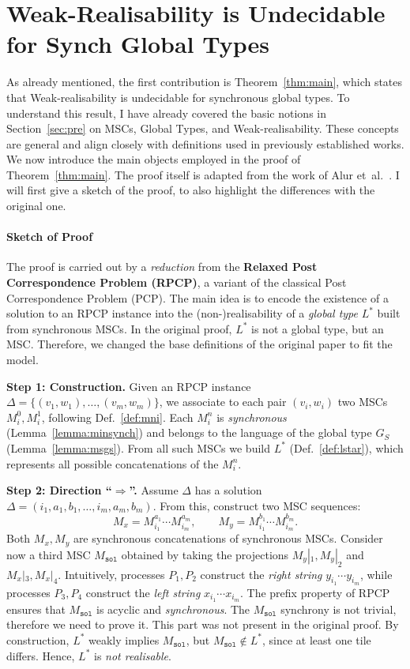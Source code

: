 \chapter{Weak-Realisability is Undecidable for Synch Global Types}\label{sec:proof}

As already mentioned, the first contribution is Theorem~\ref{thm:main},
which states that Weak-realisability is undecidable for synchronous global types. 
To understand this result, I have already covered the basic notions in 
Section~\ref{sec:pre} on MSCs, Global Types, and Weak-realisability. 
These concepts are general and align 
closely with definitions used in previously established works. 
We now introduce the main objects employed in the proof of Theorem~\ref{thm:main}. 
The proof itself is adapted from the work of 
Alur et~al.~\cite{alur2005realizability}. 
I will first give a sketch of the proof, to also highlight the 
differences with the original one.

\subsubsection*{Sketch of Proof}
The proof is carried out by a \emph{reduction} from the
\textbf{Relaxed Post Correspondence Problem (RPCP)}, a variant of
the classical Post Correspondence Problem (PCP).
The main idea is to encode the existence of a
solution to an RPCP instance into the (non-)realisability of a
\emph{global type} $L^*$ built from synchronous MSCs. 
In the original proof, $L^*$ is not a global type, but an MSC.
Therefore, we changed the base definitions of the original paper
to fit the model. 

\bigskip

\textbf{Step 1: Construction.}
Given an RPCP instance $\Delta = \{(v_1,w_1),\ldots,(v_m,w_m)\}$,
we associate to each pair $(v_i,w_i)$ two MSCs $M^0_i,M^1_i$,
following Def.~\ref{def:mni}. Each $M^n_i$ is \emph{synchronous}
(Lemma~\ref{lemma:minsynch}) and belongs to the language of the
global type $G_S$ (Lemma~\ref{lemma:msgs}). From all such MSCs we
build $L^*$ (Def.~\ref{def:lstar}), which represents all possible
concatenations of the $M^n_i$.

\bigskip

\textbf{Step 2: Direction ``$\Rightarrow$''.}
Assume $\Delta$ has a solution $\Delta=(i_1,a_1,b_1,\ldots,i_m,a_m,b_m)$.
From this, construct two MSC sequences:
\[
M_x = M^{a_1}_{i_1}\cdots M^{a_m}_{i_m}, \qquad
M_y = M^{b_1}_{i_1}\cdots M^{b_m}_{i_m}.
\]
Both $M_x,M_y$ are synchronous concatenations of synchronous MSCs.
Consider now a third MSC $M_{\texttt{sol}}$ obtained by taking the projections
$M_y|_1,M_y|_2$ and $M_x|_3,M_x|_4$. Intuitively, processes $P_1,P_2$
construct the \emph{right string} $y_{i_1}\cdots y_{i_m}$, while
processes $P_3,P_4$ construct the \emph{left string}
$x_{i_1}\cdots x_{i_m}$. The prefix property of RPCP ensures that
$M_{\texttt{sol}}$ is acyclic and \emph{synchronous}. 
The $M_{\texttt{sol}}$ synchrony is not trivial, therefore we need to prove it.
This part was not present in the original proof.
By construction, $L^*$ weakly
implies $M_{\texttt{sol}}$, but $M_{\texttt{sol}} \notin L^*$, since at least one tile
differs. Hence, $L^*$ is \emph{not realisable}.


